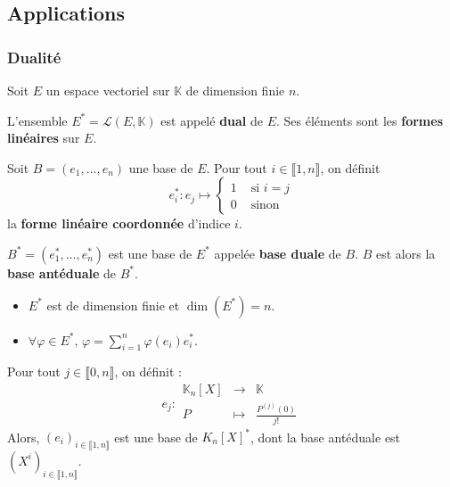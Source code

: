 	\subsection{Applications}

	\subsubsection{Dualité}

	Soit $E$ un espace vectoriel sur $\mathbb{K}$ de dimension finie $n$.

	\begin{definition}
		L'ensemble $E^* = \mathcal{L}(E, \mathbb{K})$ est appelé \textbf{dual} de $E$. Ses éléments sont les \textbf{formes linéaires} sur $E$.
	\end{definition}

	\begin{definition}
		Soit $B = (e_1, \dots, e_n)$ une base de $E$. Pour tout $i \in \llbracket 1, n \rrbracket$, on définit
		\[
		e_i^* : e_j \mapsto
		\begin{cases}
			1 &\text{ si } i = j \\
			0 &\text{ sinon}
		\end{cases}
		\]
		la \textbf{forme linéaire coordonnée} d'indice $i$.
	\end{definition}

	\begin{theorem}
		$B^* = (e_1^*, \dots, e_n^*)$ est une base de $E^*$ appelée \textbf{base duale} de $B$. $B$ est alors la \textbf{base antéduale} de $B^*$.
	\end{theorem}

	\begin{corollary}
		\begin{itemize}
			\item $E^*$ est de dimension finie et $\dim(E^*) = n$.
			\item $\forall \varphi \in E^*, \, \varphi = \sum_{i=1}^n \varphi(e_i) e_i^*$.
		\end{itemize}
	\end{corollary}


	\begin{application}
		Pour tout $j \in \llbracket 0, n \rrbracket$, on définit :
		\[
			e_j : \begin{array}{ccc}
				\mathbb{K}_n[X] &\rightarrow& \mathbb{K} \\
				P &\mapsto& \frac{P^{(j)}(0)}{j!}
			\end{array}
		\]
		Alors, $(e_i)_{i \in \llbracket 1, n \rrbracket}$ est une base de $K_n[X]^*$, dont la base antéduale est $(X^i)_{i \in \llbracket 1, n \rrbracket}$.
	\end{application}

